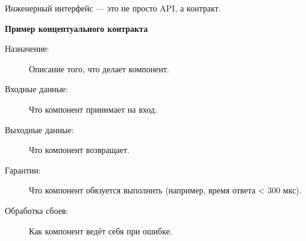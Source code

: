 Инженерный интерфейс — это не просто API, а контракт.

\begin{box_tip}
    \textbf{Пример концептуального контракта}

    \begin{description}
        \item[Назначение:] Описание того, что делает компонент.
        \item[Входные данные:] Что компонент принимает на вход.
        \item[Выходные данные:] Что компонент возвращает.
        \item[Гарантии:] Что компонент обязуется выполнить (например, время ответа < 300 мкс).
        \item[Обработка сбоев:] Как компонент ведёт себя при ошибке.
    \end{description}
\end{box_tip}

\lipsum[2] %


